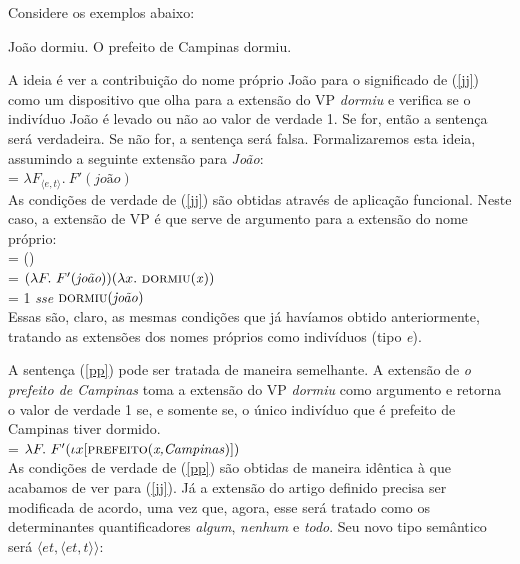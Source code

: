 Considere os exemplos abaixo:

\begin{exe}
\ex João dormiu.\label{jj}
\ex O prefeito de Campinas dormiu.\label{pp}
\end{exe}

\n A ideia é ver a contribuição do nome próprio João para o
significado de (\ref{jj}) como um dispositivo que olha para a
extensão do VP \textit{dormiu} e verifica se o indivíduo João é levado ou
não ao valor de verdade 1. Se for, então a sentença será
verdadeira. Se não for, a sentença será falsa. Formalizaremos esta
ideia, assumindo a seguinte extensão para \textit{João}:\\

\n {} = $\lambda F_{\langle e,t\rangle}.\ F'(\textit{joão})$\\

\n As condições de verdade de (\ref{jj}) são obtidas através de
aplicação funcional. Neste caso, a extensão de VP é que serve de
argumento para a extensão do nome próprio:\\

\n {} =
()\\

\n = $(\lambda F.\ F'(\textit{joão}))(\lambda x.\ \predica{dormiu}{x})$\\

\n = 1 \textit{sse} $\text{\textsc{dormiu}(\textit{joão})}$\\

\n Essas são, claro, as mesmas condições que já havíamos obtido
anteriormente, tratando as extensões dos nomes próprios como
indivíduos (tipo \textit{e}).


A sentença (\ref{pp}) pode ser tratada de maneira semelhante. A
extensão de \textit{o prefeito de Campinas} toma a extensão do VP
\textit{dormiu} como argumento e retorna o valor de verdade 1 se, e
somente se, o único indivíduo que é prefeito de Campinas tiver
dormido.\\

\n {} = $\lambda F.\ F'(\iota x [\text{\textsc{prefeito}(\textit{x,Campinas})}])$\\

As condições de verdade de (\ref{pp}) são obtidas de maneira
idêntica à que acabamos de ver para (\ref{jj}). Já a extensão do
artigo definido precisa ser modificada de acordo, uma vez que, agora, esse
será tratado como os determinantes quantificadores \textit{algum},
\textit{nenhum} e \textit{todo}. Seu novo tipo semântico será $\langle et,\langle
et,t\rangle\rangle$:\\

